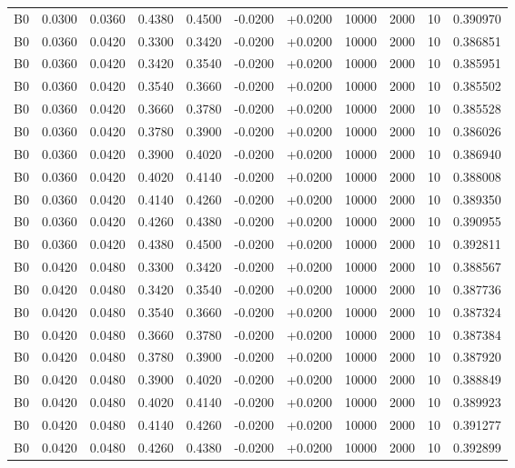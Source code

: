 \documentclass{article}
\begin{document}
\begin{longtable}{l r r r r r r r r r l}
B0 & 0.0300 & 0.0360 & 0.4380 & 0.4500 & -0.0200 & +0.0200 & 10000 & 2000 & 10 & 0.390970 \\
B0 & 0.0360 & 0.0420 & 0.3300 & 0.3420 & -0.0200 & +0.0200 & 10000 & 2000 & 10 & 0.386851 \\
B0 & 0.0360 & 0.0420 & 0.3420 & 0.3540 & -0.0200 & +0.0200 & 10000 & 2000 & 10 & 0.385951 \\
B0 & 0.0360 & 0.0420 & 0.3540 & 0.3660 & -0.0200 & +0.0200 & 10000 & 2000 & 10 & 0.385502 \\
B0 & 0.0360 & 0.0420 & 0.3660 & 0.3780 & -0.0200 & +0.0200 & 10000 & 2000 & 10 & 0.385528 \\
B0 & 0.0360 & 0.0420 & 0.3780 & 0.3900 & -0.0200 & +0.0200 & 10000 & 2000 & 10 & 0.386026 \\
B0 & 0.0360 & 0.0420 & 0.3900 & 0.4020 & -0.0200 & +0.0200 & 10000 & 2000 & 10 & 0.386940 \\
B0 & 0.0360 & 0.0420 & 0.4020 & 0.4140 & -0.0200 & +0.0200 & 10000 & 2000 & 10 & 0.388008 \\
B0 & 0.0360 & 0.0420 & 0.4140 & 0.4260 & -0.0200 & +0.0200 & 10000 & 2000 & 10 & 0.389350 \\
B0 & 0.0360 & 0.0420 & 0.4260 & 0.4380 & -0.0200 & +0.0200 & 10000 & 2000 & 10 & 0.390955 \\
B0 & 0.0360 & 0.0420 & 0.4380 & 0.4500 & -0.0200 & +0.0200 & 10000 & 2000 & 10 & 0.392811 \\
B0 & 0.0420 & 0.0480 & 0.3300 & 0.3420 & -0.0200 & +0.0200 & 10000 & 2000 & 10 & 0.388567 \\
B0 & 0.0420 & 0.0480 & 0.3420 & 0.3540 & -0.0200 & +0.0200 & 10000 & 2000 & 10 & 0.387736 \\
B0 & 0.0420 & 0.0480 & 0.3540 & 0.3660 & -0.0200 & +0.0200 & 10000 & 2000 & 10 & 0.387324 \\
B0 & 0.0420 & 0.0480 & 0.3660 & 0.3780 & -0.0200 & +0.0200 & 10000 & 2000 & 10 & 0.387384 \\
B0 & 0.0420 & 0.0480 & 0.3780 & 0.3900 & -0.0200 & +0.0200 & 10000 & 2000 & 10 & 0.387920 \\
B0 & 0.0420 & 0.0480 & 0.3900 & 0.4020 & -0.0200 & +0.0200 & 10000 & 2000 & 10 & 0.388849 \\
B0 & 0.0420 & 0.0480 & 0.4020 & 0.4140 & -0.0200 & +0.0200 & 10000 & 2000 & 10 & 0.389923 \\
B0 & 0.0420 & 0.0480 & 0.4140 & 0.4260 & -0.0200 & +0.0200 & 10000 & 2000 & 10 & 0.391277 \\
B0 & 0.0420 & 0.0480 & 0.4260 & 0.4380 & -0.0200 & +0.0200 & 10000 & 2000 & 10 & 0.392899 \\

\end{longtable}
\end{document}
